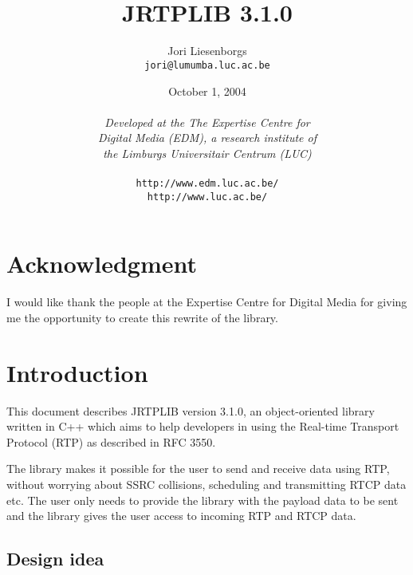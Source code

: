 \documentclass[12pt,a4paper]{article}
\newcommand{\jversion}{3.1.0}
\begin{document}
	\title{\ \vspace{3.5cm}\ \\{\bf JRTPLIB \jversion}}
	\author{Jori Liesenborgs\\{\tt jori@lumumba.luc.ac.be}}
	\date{October 1, 2004\\\vspace{0.5cm}\ \\
	      {\small{\em Developed at the The Expertise Centre for \\Digital Media (EDM),
	      a research institute of\\ the Limburgs Universitair Centrum (LUC)}\\\ \\
		  {\tt http://www.edm.luc.ac.be/}\\
		  {\tt http://www.luc.ac.be/}}}
	\maketitle
	
	\newpage
	\tableofcontents

\setlength{\parindent}{0cm}
\setlength{\parskip}{0.3cm}

	\newpage
	\section*{Acknowledgment}

		I would like thank the people at the Expertise Centre for Digital Media
		for giving me the opportunity to create this rewrite of the library.

	\newpage
	\section{Introduction}

		This document describes JRTPLIB version \jversion, an object-oriented
		library written in C++ which aims to help developers in using the 
		Real-time Transport Protocol (RTP) as described in RFC 3550.

		The library makes it possible for the user to send and receive data
		using RTP, without worrying about SSRC collisions, scheduling and
		transmitting RTCP data etc. The user only needs to provide the library
		with the payload data to be sent and the library gives the user access
		to incoming RTP and RTCP data.

		\subsection{Design idea}
\end{document}
